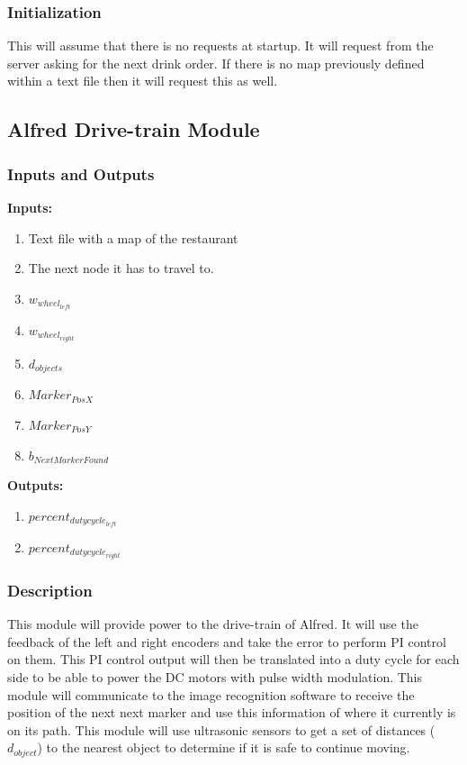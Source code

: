 \documentclass [10pt]{article}
\begin{document}
\subsubsection{Initialization}
This will assume that there is no requests at startup. It will request from the server asking for the next drink order. If there is no map previously defined within a text file then it will request this as well.

\subsection{Alfred Drive-train Module}

\subsubsection{Inputs and Outputs}

\textbf{Inputs: } 
\begin{enumerate}
	\item Text file with a map of the restaurant
	\item The next node it has to travel to.
	\item $ w_{wheel_{left}} $
	\item $ w_{wheel_{right}} $
	\item $ d_{objects} $ 
	\item $ Marker_{PosX} $
	\item $ Marker_{PosY} $
	\item $ b_{NextMarkerFound} $
\end{enumerate}

\textbf{Outputs: } 
\begin{enumerate}
	\item $ percent_{dutycycle_{left}} $
	\item $ percent_{dutycycle_{right}} $
	
\end{enumerate}

\subsubsection{Description}
This module will provide power to the drive-train of Alfred. It will use the feedback of the left and right encoders and take the error to perform PI control on them. This PI control output will then be translated into a duty cycle for each side to be able to power the DC motors with pulse width modulation. This module will communicate to the image recognition software to receive the position of the next next marker and use this information of where it currently is on its path. This module will use ultrasonic sensors to get a set of distances ($ d_{object} $) to the nearest object to determine if it is safe to continue moving.
\end{document}

